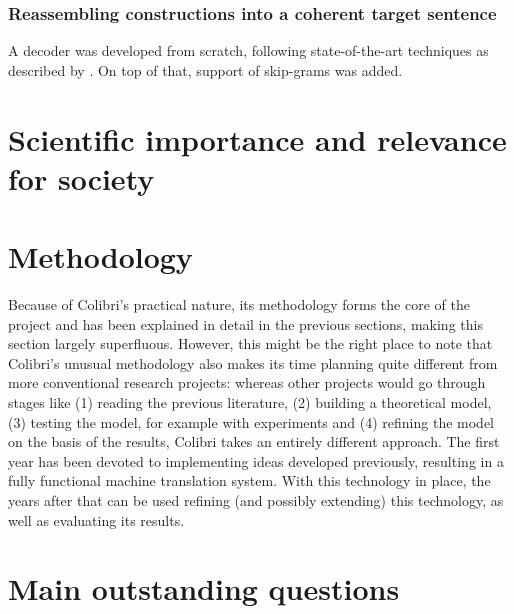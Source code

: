 \documentclass[12pt]{article}
\begin{document}
\subsubsection{Reassembling constructions into a coherent target sentence}
A decoder was developed from scratch, following state-of-the-art techniques as described by \citet{koehn03}. On top of that, support of skip-grams was added.










\section{Scientific importance and relevance for society}






\section{Methodology}

Because of Colibri's practical nature, its methodology forms the core of the project and has been explained in detail in the previous sections, making this section largely superfluous. However, this might be the right place to note that Colibri's unusual methodology also makes its time planning quite different from more conventional research projects: whereas other projects would go through stages like (1) reading the previous literature, (2) building a theoretical model, (3) testing the model, for example with experiments and (4) refining the model on the basis of the results, Colibri takes an entirely different approach. The first year has been devoted to implementing ideas developed previously, resulting in a fully functional machine translation system. With this technology in place, the years after that can be used refining (and possibly extending) this technology, as well as evaluating its results.





\section{Main outstanding questions}
\end{document}
